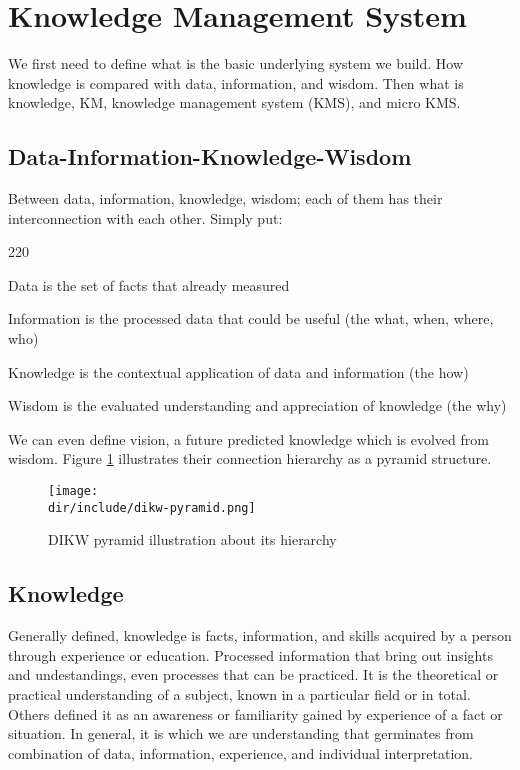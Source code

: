 \section{Knowledge Management System}
\label{sec:kms}

We first need to define what is the basic underlying system we build.
How knowledge is compared with data, information, and wisdom.
Then what is knowledge, \ac{KM}, knowledge management system (\ac{KMS}), and micro \ac{KMS}.

\subsection{Data-Information-Knowledge-Wisdom}

Between data, information, knowledge, wisdom; each of them has their interconnection with each other. Simply put:

\begin{dinglist}{220}
\item Data is the set of facts that already measured
\item Information is the processed data that could be useful (the what, when, where, who)
\item Knowledge is the contextual application of data and information (the how)
\item Wisdom is the evaluated understanding and appreciation of knowledge (the why)
\end{dinglist}

We can even define vision, a future predicted knowledge which is evolved from wisdom.
Figure \ref{fig:kms:dikw-pyramid} illustrates their connection hierarchy as a pyramid structure.

\begin{figure}[htbp]
    \centering
    \texttt{[image: \\dir/include/dikw-pyramid.png]}
    \caption[DIKW Pyramid]{DIKW pyramid illustration about its hierarchy}
    \label{fig:kms:dikw-pyramid}
\end{figure}

\subsection{Knowledge}

Generally defined, knowledge is facts, information, and skills acquired by a person through experience or education.
Processed information that bring out insights and undestandings, even processes that can be practiced.
It is the theoretical or practical understanding of a subject, known in a particular field or in total.
Others defined it as an awareness or familiarity gained by experience of a fact or situation.
In general, it is which we are understanding that germinates from combination of data, information, experience, and individual interpretation.~\autocite{BD2015Knowledge}

